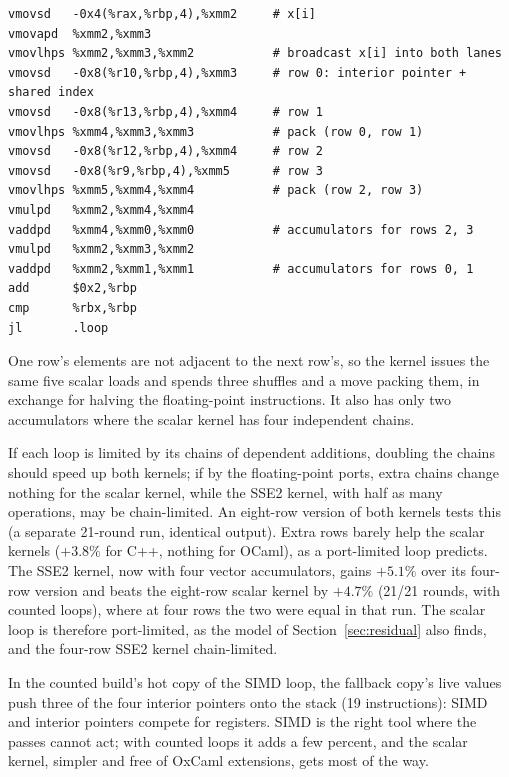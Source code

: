 \begin{lstlisting}[language=asmX,caption={The SSE2 kernel's inner loop without safepoints: 16 instructions per iteration against the scalar loop's 13, the extra work being packing.},label=lst:simd-asm]
vmovsd   -0x4(%rax,%rbp,4),%xmm2     # x[i]
vmovapd  %xmm2,%xmm3
vmovlhps %xmm2,%xmm3,%xmm2           # broadcast x[i] into both lanes
vmovsd   -0x8(%r10,%rbp,4),%xmm3     # row 0: interior pointer + shared index
vmovsd   -0x8(%r13,%rbp,4),%xmm4     # row 1
vmovlhps %xmm4,%xmm3,%xmm3           # pack (row 0, row 1)
vmovsd   -0x8(%r12,%rbp,4),%xmm4     # row 2
vmovsd   -0x8(%r9,%rbp,4),%xmm5      # row 3
vmovlhps %xmm5,%xmm4,%xmm4           # pack (row 2, row 3)
vmulpd   %xmm2,%xmm4,%xmm4
vaddpd   %xmm4,%xmm0,%xmm0           # accumulators for rows 2, 3
vmulpd   %xmm2,%xmm3,%xmm2
vaddpd   %xmm2,%xmm1,%xmm1           # accumulators for rows 0, 1
add      $0x2,%rbp
cmp      %rbx,%rbp
jl       .loop
\end{lstlisting}

One row's elements are not adjacent to the next row's, so the kernel issues
the same five scalar loads and spends three shuffles and a move packing them,
in exchange for halving the floating-point instructions. It also has only two
accumulators where the scalar kernel has four independent chains.

If each loop is limited by its chains of dependent additions, doubling the
chains should speed up both kernels; if by the floating-point ports, extra
chains change nothing for the scalar kernel, while the SSE2 kernel, with half
as many operations, may be chain-limited. An eight-row version of both
kernels tests this (a separate 21-round run, identical output). Extra rows
barely help the scalar kernels ($+3.8\%$ for C++, nothing for OCaml), as a
port-limited loop predicts. The SSE2 kernel, now with four vector accumulators, gains $+5.1\%$
over its four-row version and beats the eight-row scalar kernel by $+4.7\%$
(21/21 rounds, with counted loops), where at four rows the two were equal in
that run. The
scalar loop is therefore port-limited, as the model of
Section~\ref{sec:residual} also finds, and the four-row SSE2 kernel
chain-limited.

In the counted build's hot copy of the SIMD loop, the fallback copy's live
values push three of the four interior pointers onto the stack (19
instructions): SIMD and interior pointers compete for registers. SIMD is the right tool where
the passes cannot act; with counted loops it adds a few percent, and the
scalar kernel, simpler and free of OxCaml extensions, gets most of the way.
